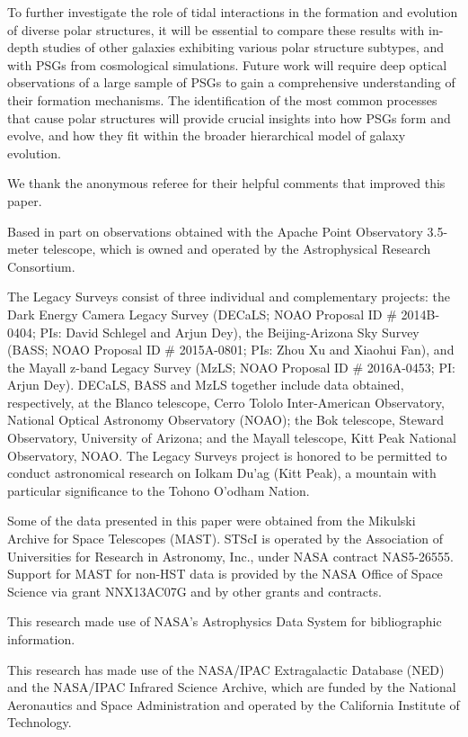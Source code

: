 \documentclass[letter]{aa}
\begin{document}
To further investigate the role of tidal interactions in the formation and evolution of diverse polar structures, it will be essential to compare these results with in-depth studies of other galaxies exhibiting various polar structure subtypes, and with PSGs from cosmological simulations. Future work will require deep optical observations of a large sample of PSGs to gain a comprehensive understanding of their formation mechanisms. The identification of the most common processes that cause polar structures will provide crucial insights into how PSGs form and evolve, and how they fit within the broader hierarchical model of galaxy evolution.

\begin{acknowledgements}
We thank the anonymous referee for their helpful comments that improved this paper.
 
Based in part on observations obtained with the Apache Point Observatory 3.5-meter telescope, which is owned and operated by the Astrophysical Research Consortium.

The Legacy Surveys consist of three individual and complementary projects: the Dark Energy Camera Legacy Survey (DECaLS; NOAO Proposal ID \# 2014B-0404; PIs: David Schlegel and Arjun Dey), the Beijing-Arizona Sky Survey (BASS; NOAO Proposal ID \# 2015A-0801; PIs: Zhou Xu and Xiaohui Fan), and the Mayall z-band Legacy Survey (MzLS; NOAO Proposal ID \# 2016A-0453; PI: Arjun Dey). DECaLS, BASS and MzLS together include data obtained, respectively, at the Blanco telescope, Cerro Tololo Inter-American Observatory, National Optical Astronomy Observatory (NOAO); the Bok telescope, Steward Observatory, University of Arizona; and the Mayall telescope, Kitt Peak National Observatory, NOAO. The Legacy Surveys project is honored to be permitted to conduct astronomical research on Iolkam Du’ag (Kitt Peak), a mountain with particular significance to the Tohono O’odham Nation.

Some of the data presented in this paper were obtained from the Mikulski Archive for Space Telescopes (MAST). STScI is operated by the Association of Universities for Research in Astronomy, Inc., under NASA contract NAS5-26555. Support for MAST for non-HST data is provided by the NASA Office of Space Science via grant NNX13AC07G and by other grants and contracts. 

This research made use of NASA’s Astrophysics Data System for bibliographic information.

This research has made use of the NASA/IPAC Extragalactic Database (NED) and the NASA/IPAC Infrared Science Archive, which are funded by the National Aeronautics and Space Administration and operated by the California Institute of Technology.
\end{acknowledgements}



\end{document}
